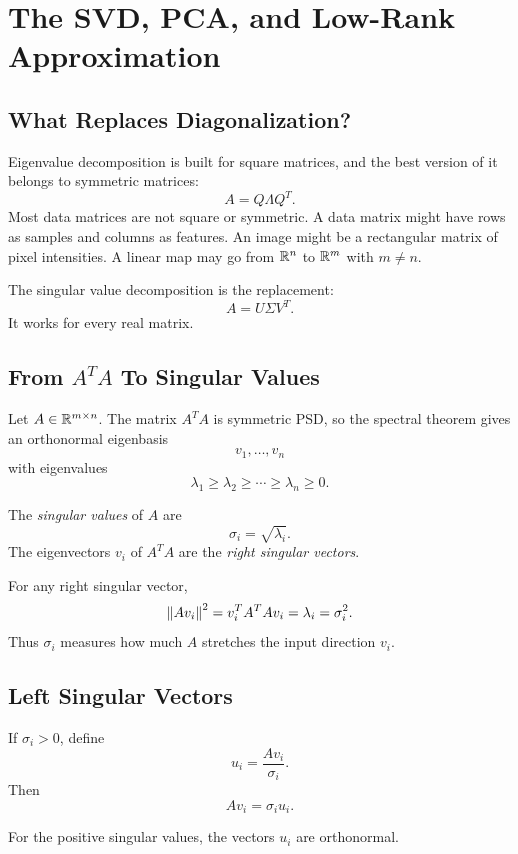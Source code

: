 \chapter{The SVD, PCA, and Low-Rank Approximation}
\label{ch:svd-pca-low-rank}

\section{What Replaces Diagonalization?}

Eigenvalue decomposition is built for square matrices, and the best version of
it belongs to symmetric matrices:
\[
  A=Q\Lambda Q^T.
\]
Most data matrices are not square or symmetric. A data matrix might have rows
as samples and columns as features. An image might be a rectangular matrix of
pixel intensities. A linear map may go from $\mathbb{R}^n$ to $\mathbb{R}^m$ with $m\neq n$.

The singular value decomposition is the replacement:
\[
  A=U\Sigma V^T.
\]
It works for every real matrix.

\section{\texorpdfstring{From $A^TA$ To Singular Values}{From A Transpose A To Singular Values}}

Let $A\in\mathbb{R}^{m\times n}$. The matrix $A^TA$ is symmetric PSD, so the spectral
theorem gives an orthonormal eigenbasis
\[
  v_1,\ldots,v_n
\]
with eigenvalues
\[
  \lambda_1\geq\lambda_2\geq\cdots\geq\lambda_n\geq 0.
\]

\begin{definition}
The \emph{singular values} of $A$ are
\[
  \sigma_i=\sqrt{\lambda_i}.
\]
The eigenvectors $v_i$ of $A^TA$ are the \emph{right singular vectors}.
\end{definition}

For any right singular vector,
\[
  \left\lVert Av_i \right\rVert^2
  =
  v_i^TA^TAv_i
  =
  \lambda_i
  =
  \sigma_i^2.
\]
Thus $\sigma_i$ measures how much $A$ stretches the input direction $v_i$.

\section{Left Singular Vectors}

If $\sigma_i>0$, define
\[
  u_i=\frac{Av_i}{\sigma_i}.
\]
Then
\[
  Av_i=\sigma_i u_i.
\]

\begin{proposition}
For the positive singular values, the vectors $u_i$ are orthonormal.
\end{proposition}

